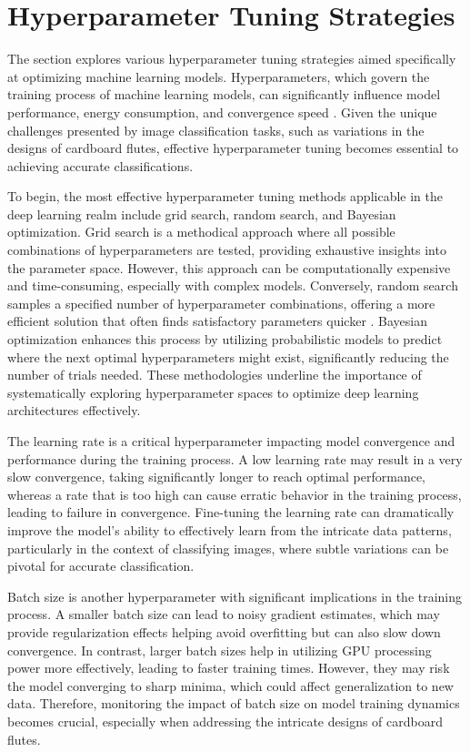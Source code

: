 \section{Hyperparameter Tuning Strategies}

The section explores various hyperparameter tuning strategies aimed specifically at optimizing machine learning models. Hyperparameters, which govern the training process of machine learning models, can significantly influence model performance, energy consumption, and convergence speed \cite{hutter2019automl}. Given the unique challenges presented by image classification tasks, such as variations in the designs of cardboard flutes, effective hyperparameter tuning becomes essential to achieving accurate classifications.


To begin, the most effective hyperparameter tuning methods applicable in the deep learning realm include grid search, random search, and Bayesian optimization. Grid search is a methodical approach where all possible combinations of hyperparameters are tested, providing exhaustive insights into the parameter space. However, this approach can be computationally expensive and time-consuming, especially with complex models. Conversely, random search samples a specified number of hyperparameter combinations, offering a more efficient solution that often finds satisfactory parameters quicker \cite{snoek2012bayesian}. Bayesian optimization enhances this process by utilizing probabilistic models to predict where the next optimal hyperparameters might exist, significantly reducing the number of trials needed. These methodologies underline the importance of systematically exploring hyperparameter spaces to optimize deep learning architectures effectively.


The learning rate is a critical hyperparameter impacting model convergence and performance during the training process. A low learning rate may result in a very slow convergence, taking significantly longer to reach optimal performance, whereas a rate that is too high can cause erratic behavior in the training process, leading to failure in convergence. Fine-tuning the learning rate can dramatically improve the model's ability to effectively learn from the intricate data patterns, particularly in the context of classifying images, where subtle variations can be pivotal for accurate classification.


Batch size is another hyperparameter with significant implications in the training process. A smaller batch size can lead to noisy gradient estimates, which may provide regularization effects helping avoid overfitting but can also slow down convergence. In contrast, larger batch sizes help in utilizing GPU processing power more effectively, leading to faster training times. However, they may risk the model converging to sharp minima, which could affect generalization to new data. Therefore, monitoring the impact of batch size on model training dynamics becomes crucial, especially when addressing the intricate designs of cardboard flutes.


